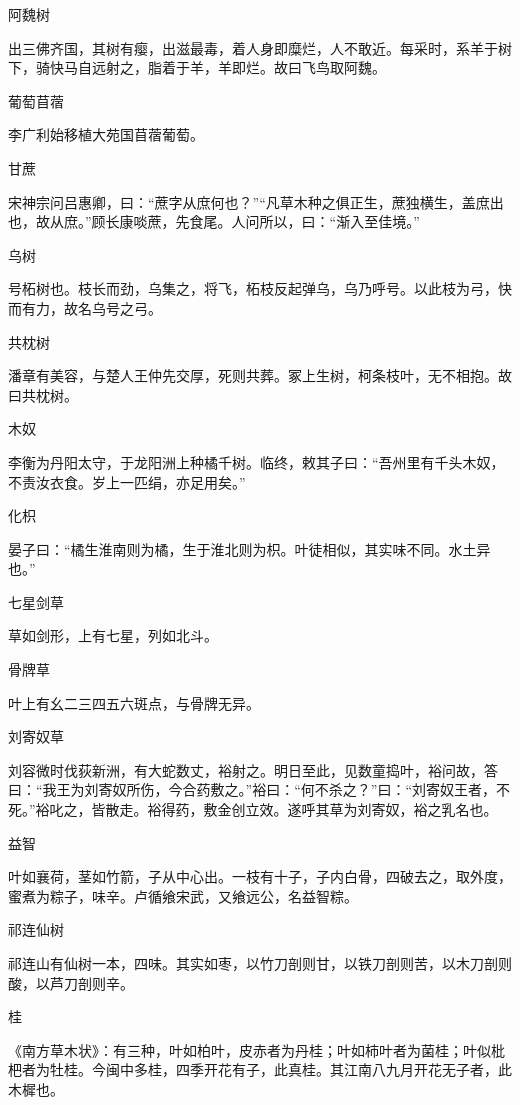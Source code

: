 \documentclass[a4paper,12pt,UTF8,twoside]{ctexbook}
\begin{document}
    阿魏树
    
    出三佛齐国，其树有瘿，出滋最毒，着人身即糜烂，人不敢近。每采时，系羊于树下，骑快马自远射之，脂着于羊，羊即烂。故曰飞鸟取阿魏。
    
    葡萄苜蓿
    
    李广利始移植大苑国苜蓿葡萄。
    
    甘蔗
    
    宋神宗问吕惠卿，曰：“蔗字从庶何也？”“凡草木种之俱正生，蔗独横生，盖庶出也，故从庶。”顾长康啖蔗，先食尾。人问所以，曰：“渐入至佳境。”
    
    乌树
    
    号柘树也。枝长而劲，乌集之，将飞，柘枝反起弹乌，乌乃呼号。以此枝为弓，快而有力，故名乌号之弓。
    
    共枕树
    
    潘章有美容，与楚人王仲先交厚，死则共葬。冢上生树，柯条枝叶，无不相抱。故曰共枕树。
    
    木奴
    
    李衡为丹阳太守，于龙阳洲上种橘千树。临终，敕其子曰：“吾州里有千头木奴，不责汝衣食。岁上一匹绢，亦足用矣。”
    
    化枳
    
    晏子曰：“橘生淮南则为橘，生于淮北则为枳。叶徒相似，其实味不同。水土异也。”
    
    七星剑草
    
    草如剑形，上有七星，列如北斗。
    
    骨牌草
    
    叶上有幺二三四五六斑点，与骨牌无异。
    
    刘寄奴草
    
    刘容微时伐荻新洲，有大蛇数丈，裕射之。明日至此，见数童捣叶，裕问故，答曰：“我王为刘寄奴所伤，今合药敷之。”裕曰：“何不杀之？”曰：“刘寄奴王者，不死。”裕叱之，皆散走。裕得药，敷金创立效。遂呼其草为刘寄奴，裕之乳名也。
    
    益智
    
    叶如襄荷，茎如竹箭，子从中心出。一枝有十子，子内白骨，四破去之，取外度，蜜煮为粽子，味辛。卢循飨宋武，又飨远公，名益智粽。
    
    祁连仙树
    
    祁连山有仙树一本，四味。其实如枣，以竹刀剖则甘，以铁刀剖则苦，以木刀剖则酸，以芦刀剖则辛。
    
    桂
    
    《南方草木状》：有三种，叶如柏叶，皮赤者为丹桂；叶如柿叶者为菌桂；叶似枇杷者为牡桂。今闽中多桂，四季开花有子，此真桂。其江南八九月开花无子者，此木樨也。
    
\end{document}
